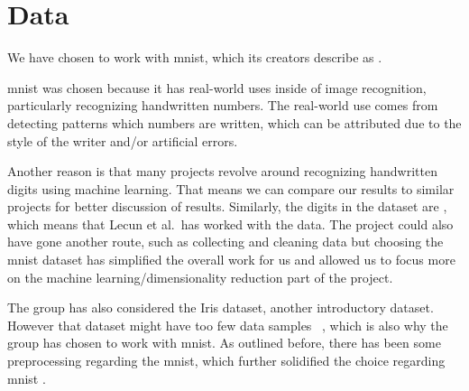 \section{Data}\label{sec:data}
We have chosen to work with \gls{mnist}, which its creators describe as
.


\gls{mnist} was chosen because it has real-world uses inside of image recognition, particularly recognizing handwritten numbers. The real-world use comes from detecting patterns which numbers are written, which can be attributed due to the style of the writer and/or artificial errors.


Another reason is that many projects revolve around recognizing handwritten digits using machine learning. That means we can compare our results to similar projects for better discussion of results. Similarly, the digits in the dataset are , which means that Lecun et al.\ has worked with the data. The project could also have gone another route, such as collecting and cleaning data but choosing the \gls{mnist} dataset has simplified the overall work for us and allowed us to focus more on the machine learning/dimensionality reduction part of the project. 


The group has also considered the Iris dataset, another introductory dataset. However that dataset might have too few data samples ~\cite{mnist-vs-iris}, which is also why the group has chosen to work with \gls{mnist}. As outlined before, there has been some preprocessing regarding the \gls{mnist}, which further solidified the choice regarding \gls{mnist} .